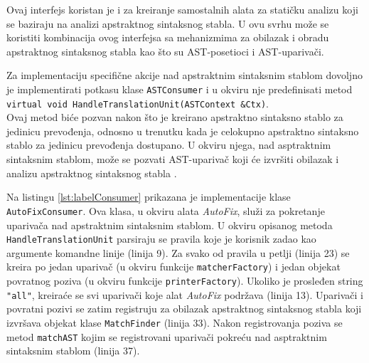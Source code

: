 \documentclass[12pt,oneside]{memoir}
\begin{document}
Ovaj interfejs koristan je i za kreiranje samostalnih alata za stati\v{c}ku analizu koji se baziraju na analizi apstraktnog sintaksnog stabla. U ovu svrhu mo\v{z}e se koristiti kombinacija
ovog interfejsa sa mehanizmima za obilazak i obradu apstraktnog sintaksnog stabla kao \v{s}to su AST-posetioci i AST-upariva\v{c}i. \par
Za implementaciju specifi\v{c}ne akcije nad apstraktnim sintaksnim stablom
dovoljno je implementirati potkasu klase \texttt{ASTConsumer} i u okviru nje predefinisati metod \\ \texttt{virtual void  HandleTranslationUnit(ASTContext \&Ctx)}.\\
Ovaj metod bi\'{c}e pozvan nakon \v{s}to je kreirano apstraktno sintaksno stablo za jedinicu prevođenja, odnosno u trenutku kada je celokupno apstraktno sintaksno stablo za jedinicu prevođenja dostupano.
U okviru njega, nad asptraktnim sintaksnim stablom, mo\v{z}e se pozvati AST-upariva\v{c} koji \'{c}e izvr\v{s}iti obilazak i analizu apstraktnog sintaksnog stabla \cite{ASTConsumer}.

\par
Na listingu \ref{lst:labelConsumer} prikazana je implementacije klase \texttt{AutoFixConsumer}. Ova klasa, u okviru alata \textit{AutoFix}, slu\v{z}i za pokretanje 
upariva\v{c}a nad apstraktnim sintaksnim stablom. U okviru opisanog metoda \texttt{HandleTranslationUnit} parsiraju se pravila koje je korisnik zadao kao argumente komandne linije (linija 9). Za svako
od pravila u petlji (linija 23) se kreira po jedan upariva\v{c} (u okviru funkcije \texttt{matcherFactory}) i jedan objekat povratnog poziva (u okviru funkcije \texttt{printerFactory}).
Ukoliko je prosleđen string \texttt{"all"}, kreira\'{c}e se svi upariva\v{c}i koje alat \textit{AutoFix} podr\v{z}ava (linija 13).
Upariva\v{c}i i povratni pozivi se zatim registruju za obilazak apstraktnog sintaksnog stabla koji izvr\v{s}ava objekat klase \texttt{MatchFinder} (linija 33). Nakon registrovanja poziva se metod \texttt{matchAST} kojim se registrovani upariva\v{c}i pokre\'{c}u nad asptraktnim sintaksnim stablom (linija 37).
\end{document}
